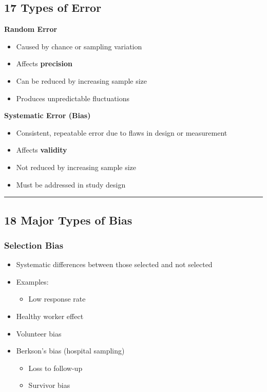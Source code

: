 \documentclass[
  letterpaper,
  DIV=11,
  numbers=noendperiod]{scrartcl}
\providecommand{\tightlist}{%
  \setlength{\itemsep}{0pt}\setlength{\parskip}{0pt}}
\begin{document}
\subsection{\texorpdfstring{{17} {Types of
Error}}{17 Types of Error}}\label{types-of-error}

\textbf{Random Error}

\begin{itemize}
\item
  Caused by chance or sampling variation
\item
  Affects \textbf{precision}
\item
  Can be reduced by increasing sample size
\item
  Produces unpredictable fluctuations
\end{itemize}

\textbf{Systematic Error (Bias)}

\begin{itemize}
\item
  Consistent, repeatable error due to flaws in design or measurement
\item
  Affects \textbf{validity}
\item
  Not reduced by increasing sample size
\item
  Must be addressed in study design
\end{itemize}

\begin{center}\rule{0.5\linewidth}{0.5pt}\end{center}

\subsection{\texorpdfstring{{18} {Major Types of
Bias}}{18 Major Types of Bias}}\label{major-types-of-bias}

\subsubsection{Selection Bias}

\begin{itemize}
\tightlist
\item
  Systematic differences between those selected and not selected
\item
  Examples:

  \begin{itemize}
  \tightlist
  \item
    Low response rate
  \end{itemize}
\item
  Healthy worker effect
\item
  Volunteer bias
\item
  Berkson's bias (hospital sampling)

  \begin{itemize}
  \tightlist
  \item
    Loss to follow-up
  \item
    Survivor bias
  \end{itemize}
\end{itemize}
\end{document}
